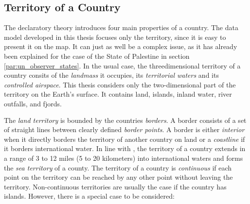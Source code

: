 \subsection{Territory of a Country} %
\label{sub:territory_of_a_country}

The declaratory theory introduces four main properties of a country. The data model developed in this thesis focuses only the territory, since it is easy to present it on the map. It can just as well be a complex issue, as it has already been explained for the case of the State of Palestine in section \ref{par:un_observer_states}. In the usual case, the threedimensional territory of a country consits of the \emph{landmass} it occupies, its \emph{territorial waters} and its \emph{controlled airspace}. This thesis considers only the two-dimensional part of the territory on the Earth's surface. It contains land, islands, inland water, river outfalls, and fjords.

The \emph{land territory} is bounded by the countries \emph{borders}. A border consists of a set of straight lines between clearly defined \emph{border points}.
A border is either \emph{interior} when it directly borders the territory of another country on land or a \emph{coastline} if it borders international water. In line with \cite{UNSeaBorders}, the territory of a country extends in a range of 3 to 12 miles (5 to 20 kilometers) into international waters and forms the \emph{sea territory} of a county.
The territory of a country is \emph{continuous} if each point on the territory can be reached by any other point without leaving the territory. Non-continuous territories are usually the case if the country has islands. However, there is a special case to be considered:

